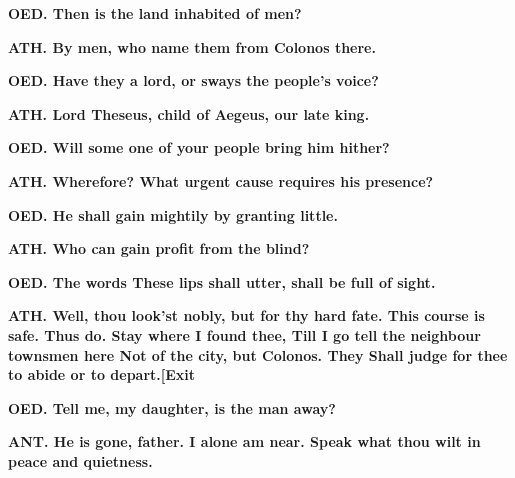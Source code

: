 \documentclass[11pt,letter]{book}
\begin{document}
\par \textbf{OED. Then is the land inhabited of men?}
\par 

\par \textbf{ATH. By men, who name them from Colonos there.}
\par 

\par \textbf{OED. Have they a lord, or sways the people’s voice?}
\par 

\par \textbf{ATH. Lord Theseus, child of Aegeus, our late king.}
\par 

\par \textbf{OED. Will some one of your people bring him hither?}
\par 

\par \textbf{ATH. Wherefore? What urgent cause requires his presence?}
\par 

\par \textbf{OED. He shall gain mightily by granting little.}
\par 

\par \textbf{ATH. Who can gain profit from the blind?}
\par 

\par \textbf{OED. The words These lips shall utter, shall be full of sight.}
\par 

\par \textbf{ATH. Well, thou look’st nobly, but for thy hard fate. This course is safe. Thus do. Stay where I found thee, Till I go tell the neighbour townsmen here Not of the city, but Colonos. They Shall judge for thee to abide or to depart.[Exit}
\par 

\par \textbf{OED. Tell me, my daughter, is the man away?}
\par 

\par \textbf{ANT. He is gone, father. I alone am near. Speak what thou wilt in peace and quietness.}
\par 
\end{document}
